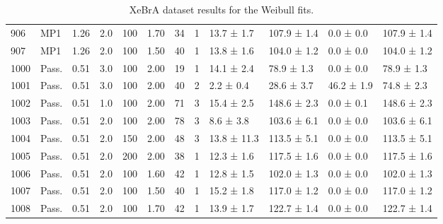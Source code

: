 \begin{table}
{\begin{tabular}{llllllllllll}
            906 &           MP1 &        1.26 &       2.0 &              100 &            1.70 &  34 &           1 &  13.7 ± 1.7 &  107.9 ± 1.4 &    0.0 ± 0.0 & 107.9 ± 1.4 \\
            907 &           MP1 &        1.26 &       2.0 &              100 &            1.50 &  40 &           1 &  13.8 ± 1.6 &  104.0 ± 1.2 &    0.0 ± 0.0 & 104.0 ± 1.2 \\
           1000 &         Pass. &        0.51 &       3.0 &              100 &            2.00 &  19 &           1 &  14.1 ± 2.4 &   78.9 ± 1.3 &    0.0 ± 0.0 &  78.9 ± 1.3 \\
           1001 &         Pass. &        0.51 &       3.0 &              100 &            2.00 &  40 &           2 &   2.2 ± 0.4 &   28.6 ± 3.7 &   46.2 ± 1.9 &  74.8 ± 2.3 \\
           1002 &         Pass. &        0.51 &       1.0 &              100 &            2.00 &  71 &           3 &  15.4 ± 2.5 &  148.6 ± 2.3 &    0.0 ± 0.1 & 148.6 ± 2.3 \\
           1003 &         Pass. &        0.51 &       2.0 &              100 &            2.00 &  78 &           3 &   8.6 ± 3.8 &  103.6 ± 6.1 &    0.0 ± 0.0 & 103.6 ± 6.1 \\
           1004 &         Pass. &        0.51 &       2.0 &              150 &            2.00 &  48 &           3 & 13.8 ± 11.3 &  113.5 ± 5.1 &    0.0 ± 0.0 & 113.5 ± 5.1 \\
           1005 &         Pass. &        0.51 &       2.0 &              200 &            2.00 &  38 &           1 &  12.3 ± 1.6 &  117.5 ± 1.6 &    0.0 ± 0.0 & 117.5 ± 1.6 \\
           1006 &         Pass. &        0.51 &       2.0 &              100 &            1.60 &  42 &           1 &  12.8 ± 1.5 &  102.0 ± 1.3 &    0.0 ± 0.0 & 102.0 ± 1.3 \\
           1007 &         Pass. &        0.51 &       2.0 &              100 &            1.50 &  40 &           1 &  15.2 ± 1.8 &  117.0 ± 1.2 &    0.0 ± 0.0 & 117.0 ± 1.2 \\
           1008 &         Pass. &        0.51 &       2.0 &              100 &            1.70 &  42 &           1 &  13.9 ± 1.7 &  122.7 ± 1.4 &    0.0 ± 0.0 & 122.7 ± 1.4 \\
\bottomrule
\end{tabular}}
\caption {XeBrA dataset results for the Weibull fits.}
    \label{tab:weibull_table}
\end{table}